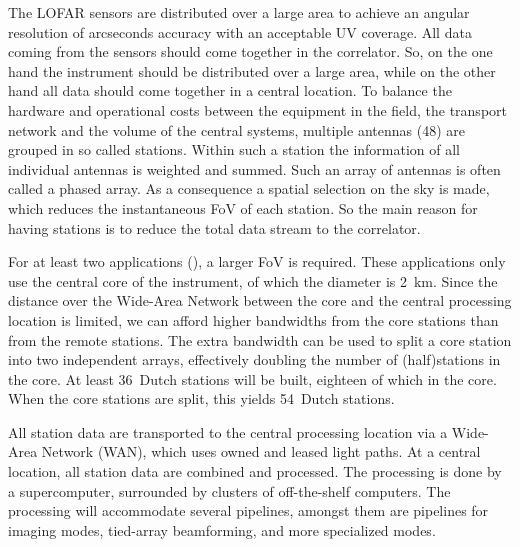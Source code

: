 \documentclass[journal]{IEEEtran}
\begin{document}
The LOFAR sensors are distributed over a large area to achieve an angular
resolution of arcseconds accuracy with an acceptable UV coverage.
All data coming from the sensors should come together in the correlator. So, on the one hand the instrument should be distributed over a large area, while on the other hand all data should come together in a central location. To balance the hardware and operational costs between the equipment in the field, the transport network and the volume of the central systems, multiple antennas (48) are grouped in so called stations. Within such a station the information of all individual antennas is weighted and summed. Such an array of antennas is often called a phased array. As a consequence a spatial selection on the sky is made, which reduces the instantaneous FoV of each station. So the main reason for having stations is to reduce the total data stream to the correlator.

For at least two applications (), a larger FoV is required.
These applications only use the central core of the instrument, of which the
diameter is 2~km.
Since the distance over the Wide-Area Network between the core and the central
processing location is limited, we can afford higher bandwidths from the
core stations than from the remote stations.
The extra bandwidth can be used to split a core station into two independent
arrays, effectively doubling the number of (half)stations in the core.
At least 36~Dutch stations will be built, eighteen of which in the core.
When the core stations are split, this yields 54~Dutch stations.

All station data are transported to the central processing location via a
Wide-Area Network (WAN), which uses owned and leased light paths.
At a central location, all station data are combined and processed.
The processing is done by a supercomputer, surrounded by clusters of
off-the-shelf computers.
The processing will accommodate several pipelines, amongst them are pipelines
for imaging modes, tied-array beamforming, and more specialized modes.


 


\end{document}
